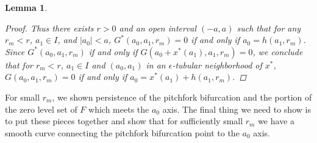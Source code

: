 \documentclass[12pt]{article}
\newtheorem{lemma}{Lemma}
\begin{document}
\begin{lemma}
\begin{proof}
Thus there exists $r > 0$ and an open interval $(-a, a)$ such that for any $r_m < r$, $a_1 \in I$, and $|a_0| < a$, $G^*(a_0, a_1, r_m) = 0$ if and only if $a_0 = h(a_1, r_m)$.\\

Since $G^*(a_0, a_1, r_m)$ if and only if $G(a_0 + x^*(a_1), a_1, r_m) = 0$, we conclude that for $r_m < r$, $a_1 \in I$ and $(a_0, a_1)$ in an $\epsilon$-tubular neighborhood of $x^*$, $G(a_0, a_1, r_m) = 0$ if and only if $a_0 = x^*(a_1) + h(a_1, r_m)$.

\end{proof}
\end{lemma}

For small $r_m$, we shown persistence of the pitchfork bifurcation and the portion of the zero level set of $F$ which meets the $a_0$ axis. The final thing we need to show is to put these pieces together and show that for sufficiently small $r_m$ we have a smooth curve connecting the pitchfork bifurcation point to the $a_0$ axis.

\end{document}
